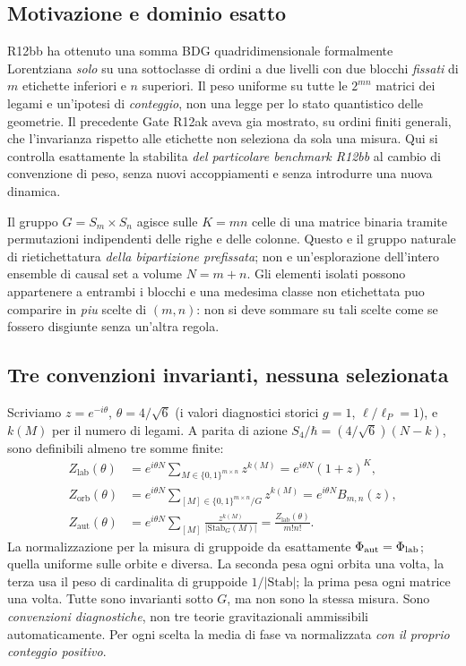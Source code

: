 \documentclass[11pt,a4paper]{article}
\begin{document}
\subsection*{Motivazione e dominio esatto}
R12bb ha ottenuto una somma BDG quadridimensionale formalmente Lorentziana \emph{solo} su una sottoclasse di ordini a due livelli con due blocchi \emph{fissati} di $m$ etichette inferiori e $n$ superiori. Il peso uniforme su tutte le $2^{mn}$ matrici dei legami e un'ipotesi di \emph{conteggio}, non una legge per lo stato quantistico delle geometrie. Il precedente Gate R12ak aveva gia mostrato, su ordini finiti generali, che l'invarianza rispetto alle etichette non seleziona da sola una misura. Qui si controlla esattamente la stabilita \emph{del particolare benchmark R12bb} al cambio di convenzione di peso, senza nuovi accoppiamenti e senza introdurre una nuova dinamica.

Il gruppo $G=S_m\times S_n$ agisce sulle $K=mn$ celle di una matrice binaria tramite permutazioni indipendenti delle righe e delle colonne. Questo e il gruppo naturale di rietichettatura \emph{della bipartizione prefissata}; non e un'esplorazione dell'intero ensemble di causal set a volume $N=m+n$. Gli elementi isolati possono appartenere a entrambi i blocchi e una medesima classe non etichettata puo comparire in \emph{piu} scelte di $(m,n)$: non si deve sommare su tali scelte come se fossero disgiunte senza un'altra regola.

\subsection*{Tre convenzioni invarianti, nessuna selezionata}
Scriviamo $z=e^{-i\theta}$, $\theta=4/\sqrt6$ (i valori diagnostici storici $g=1$, $\ell/\ell_P=1$), e $k(M)$ per il numero di legami. A parita di azione $S_4/\hbar=(4/\sqrt6)(N-k)$, sono definibili almeno tre somme finite:
\begin{align}
Z_{\mathrm{lab}}(\theta)&=e^{i\theta N}\sum_{M\in\{0,1\}^{m\times n}}z^{k(M)}
 = e^{i\theta N}(1+z)^{K},\\
Z_{\mathrm{orb}}(\theta)&=e^{i\theta N}\sum_{[M]\in\{0,1\}^{m\times n}/G}z^{k(M)}
 =e^{i\theta N}B_{m,n}(z),\\
Z_{\mathrm{aut}}(\theta)&=e^{i\theta N}\sum_{[M]}\frac{z^{k(M)}}{|\mathrm{Stab}_G(M)|}
 =\frac{Z_{\mathrm{lab}}(\theta)}{m!n!}.
\end{align}
La normalizzazione per la misura di gruppoide da esattamente $\Phi_{\rm aut}=\Phi_{\rm lab}$; quella uniforme sulle orbite e diversa. La seconda pesa ogni orbita una volta, la terza usa il peso di cardinalita di gruppoide $1/|\mathrm{Stab}|$; la prima pesa ogni matrice una volta. Tutte sono invarianti sotto $G$, ma non sono la stessa misura. Sono \emph{convenzioni diagnostiche}, non tre teorie gravitazionali ammissibili automaticamente. Per ogni scelta la media di fase va normalizzata \emph{con il proprio conteggio positivo}.
\end{document}
